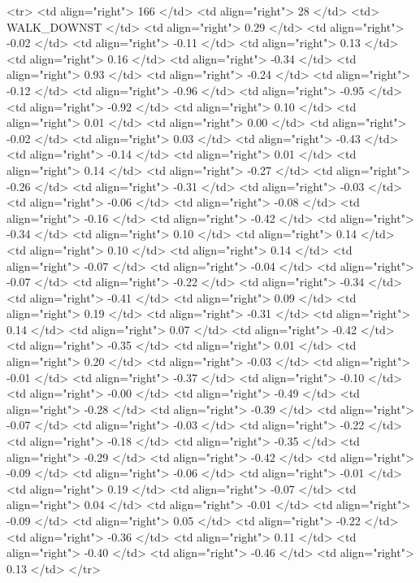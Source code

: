  <tr> <td align="right"> 166 </td> <td align="right">  28 </td> <td> WALK_DOWNST </td> <td align="right"> 0.29 </td> <td align="right"> -0.02 </td> <td align="right"> -0.11 </td> <td align="right"> 0.13 </td> <td align="right"> 0.16 </td> <td align="right"> -0.34 </td> <td align="right"> 0.93 </td> <td align="right"> -0.24 </td> <td align="right"> -0.12 </td> <td align="right"> -0.96 </td> <td align="right"> -0.95 </td> <td align="right"> -0.92 </td> <td align="right"> 0.10 </td> <td align="right"> 0.01 </td> <td align="right"> 0.00 </td> <td align="right"> -0.02 </td> <td align="right"> 0.03 </td> <td align="right"> -0.43 </td> <td align="right"> -0.14 </td> <td align="right"> 0.01 </td> <td align="right"> 0.14 </td> <td align="right"> -0.27 </td> <td align="right"> -0.26 </td> <td align="right"> -0.31 </td> <td align="right"> -0.03 </td> <td align="right"> -0.06 </td> <td align="right"> -0.08 </td> <td align="right"> -0.16 </td> <td align="right"> -0.42 </td> <td align="right"> -0.34 </td> <td align="right"> 0.10 </td> <td align="right"> 0.14 </td> <td align="right"> 0.10 </td> <td align="right"> 0.14 </td> <td align="right"> -0.07 </td> <td align="right"> -0.04 </td> <td align="right"> -0.07 </td> <td align="right"> -0.22 </td> <td align="right"> -0.34 </td> <td align="right"> -0.41 </td> <td align="right"> 0.09 </td> <td align="right"> 0.19 </td> <td align="right"> -0.31 </td> <td align="right"> 0.14 </td> <td align="right"> 0.07 </td> <td align="right"> -0.42 </td> <td align="right"> -0.35 </td> <td align="right"> 0.01 </td> <td align="right"> 0.20 </td> <td align="right"> -0.03 </td> <td align="right"> -0.01 </td> <td align="right"> -0.37 </td> <td align="right"> -0.10 </td> <td align="right"> -0.00 </td> <td align="right"> -0.49 </td> <td align="right"> -0.28 </td> <td align="right"> -0.39 </td> <td align="right"> -0.07 </td> <td align="right"> -0.03 </td> <td align="right"> -0.22 </td> <td align="right"> -0.18 </td> <td align="right"> -0.35 </td> <td align="right"> -0.29 </td> <td align="right"> -0.42 </td> <td align="right"> -0.09 </td> <td align="right"> -0.06 </td> <td align="right"> -0.01 </td> <td align="right"> 0.19 </td> <td align="right"> -0.07 </td> <td align="right"> 0.04 </td> <td align="right"> -0.01 </td> <td align="right"> -0.09 </td> <td align="right"> 0.05 </td> <td align="right"> -0.22 </td> <td align="right"> -0.36 </td> <td align="right"> 0.11 </td> <td align="right"> -0.40 </td> <td align="right"> -0.46 </td> <td align="right"> 0.13 </td> </tr>
